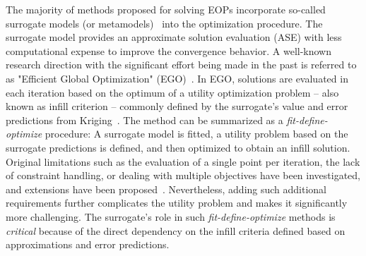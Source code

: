 \documentclass[journal]{IEEEtran}
\begin{document}
The majority of methods proposed for solving EOPs incorporate so-called surrogate models (or metamodels)~\cite{2011-jin-surrogate-recent} into the optimization procedure. The surrogate model provides an approximate solution evaluation (ASE) with less computational expense to improve the convergence behavior.
A well-known research direction with the significant effort being made in the past is referred to as "Efficient Global Optimization" (EGO)~\cite{1998-jones-ego}.
In EGO, solutions are evaluated in each iteration based on the optimum of a utility optimization problem -- also known as infill criterion -- commonly defined by the surrogate's value and error predictions from Kriging~\cite{1951-krige-mine}.
The method can be summarized as a \emph{fit-define-optimize} procedure: A surrogate model is fitted, a utility problem based on the surrogate predictions is defined, and then optimized to obtain an infill solution. 
Original limitations such as the evaluation of a single point per iteration, the lack of constraint handling, or dealing with multiple objectives have been investigated, and extensions have been proposed~\cite{2016-haftka-paralllel,2006-knowles-parego}.
Nevertheless, adding such additional requirements further complicates the utility problem and makes it significantly more challenging.
The surrogate's role in such \emph{fit-define-optimize}  methods is \emph{critical} because of the direct dependency on the infill criteria defined based on approximations and error predictions.
\end{document}
